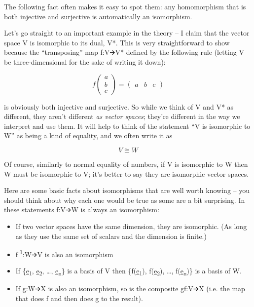 \documentclass[oneside,english]{amsbook}
\numberwithin{section}{chapter}
\theoremstyle{plain}
\theoremstyle{definition}
\begin{document}
The following fact often makes it easy to spot them: any homomorphism
that is both injective and surjective is automatically an isomorphism.

Let's go straight to an important example in the theory -- I claim that
the vector space V is isomorphic to its dual, V*. This is very
straightforward to show because the ``transposing'' map f:V🡪V* defined
by the following rule (letting V be three-dimensional for the sake of
writing it down):

\[f\begin{pmatrix}
	a \\
	b \\
	c
\end{pmatrix} = \begin{pmatrix}
	a & b & c
\end{pmatrix}\]

is obviously both injective and surjective. So while we think of V and
V* as different, they aren't different \emph{as vector spaces}; they're
different in the way we interpret and use them. It will help to think of
the statement ``V is isomorphic to W'' as being a kind of equality, and
we often write it as

\[V \cong W\]

Of course, similarly to normal equality of numbers, if V is isomorphic
to W then W must be isomorphic to V; it's better to say they are
isomorphic vector spaces.

Here are some basic facts about isomorphisms that are well worth knowing
-- you should think about why each one would be true as some are a bit
surprising. In these statements f:V🡪W is always an isomorphism:

\begin{itemize}
	\item
	If two vector spaces have the same dimension, they are isomorphic. (As
	long as they use the same set of scalars and the dimension is finite.)
	\item
	f\textsuperscript{-1}:W🡪V is also an isomorphism
	\item
	If \{\ul{e}\textsubscript{1}, \ul{e}\textsubscript{2}, \ldots,
	\ul{e}\textsubscript{n}\} is a basis of V then
	\{f(\ul{e}\textsubscript{1}), f(\ul{e}\textsubscript{2}), \ldots,
	f(\ul{e}\textsubscript{n})\} is a basis of W.
	\item
	If g:W🡪X is also an isomorphism, so is the composite gf:V🡪X (i.e. the
	map that does f and then does g to the result).
\end{itemize}
\end{document}
